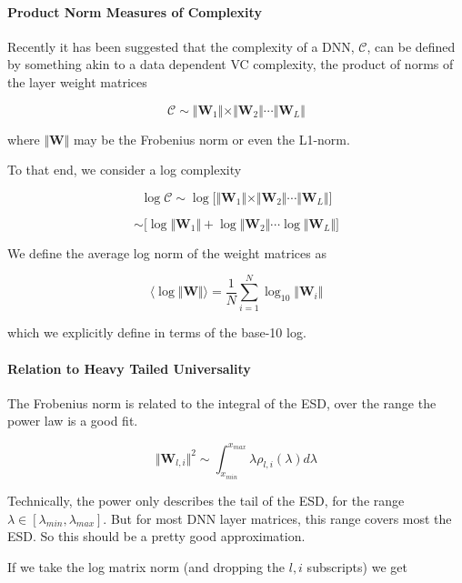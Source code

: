 
\paragraph{Product Norm Measures of Complexity}

Recently it has been suggested that the complexity of a DNN, $\mathcal{C}$,  can be defined by something akin to a data dependent VC complexity, the product of norms of the layer weight matrices

$$\mathcal{C}\sim\Vert\mathbf{W}_{1}\Vert\times\Vert\mathbf{W}_{2}\Vert\cdots\Vert\mathbf{W}_{L}\Vert$$

where $\Vert\mathbf{W}\Vert$ may be the Frobenius norm or even the L1-norm.


 To that end, we consider a log complexity

$$\log\mathcal{C}\sim\log\bigg[\Vert\mathbf{W}_{1}\Vert\times\Vert\mathbf{W}_{2}\Vert\cdots\Vert\mathbf{W}_{L}\Vert\bigg]$$

$$\sim\bigg[\log\Vert\mathbf{W}_{1}\Vert+\log\Vert\mathbf{W}_{2}\Vert\cdots\log\Vert\mathbf{W}_{L}\Vert\bigg]$$

We define the average log norm of the weight matrices as

$$\langle\log\Vert\mathbf{W}\Vert\rangle=\dfrac{1}{N}\sum_{i=1}^{N}\log_{10}\Vert\mathbf{W}_{i}\Vert$$

which we explicitly define in terms of the base-10 log.

\paragraph{Relation to Heavy Tailed Universality}

The Frobenius norm is related to the integral of the ESD, over the range the power law is a good fit. 

$$\Vert\mathbf{W}_{l,i}\Vert^{2}\sim\int_{x_{min}}^{x_{max}}\lambda\rho_{l,i}(\lambda)d\lambda$$

Technically, the power only describes the tail of the ESD,  for the range $\lambda\in[\lambda_{min},\lambda_{max}]$.
  But for most DNN layer matrices, this range covers most the ESD.  So this should be a pretty good approximation.

If we take the log matrix norm (and dropping the $l,i$ subscripts) we get

